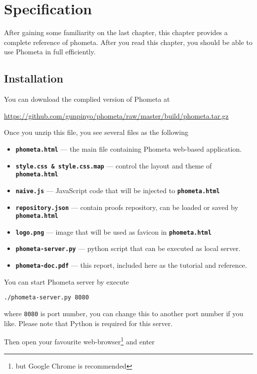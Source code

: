 \documentclass[master.tex]{subfiles}
\begin{document}
\chapter{Specification}
\label{chap:specification}

After gaining some familiarity on the last chapter, this chapter provides a
complete reference of phometa. After you read this chapter, you should be able
to use Phometa in full efficiently.

\section{Installation}

You can download the complied version of Phometa at

{\centering\url{https://github.com/gunpinyo/phometa/raw/master/build/phometa.tar.gz}}

Once you unzip this file, you see several files as the following

\begin{itemize}
\item \texttt{\textbf{phometa.html}} --- the main file containing Phometa
  web-based application.
\item \texttt{\textbf{style.css \& style.css.map}} --- control the layout and
  theme of \texttt{\textbf{phometa.html}}
\item \texttt{\textbf{naive.js}} --- JavaScript code that will be injected to
  \texttt{\textbf{phometa.html}}
\item \texttt{\textbf{repository.json}} --- contain proofs repository, can be
  loaded or saved by \texttt{\textbf{phometa.html}}
\item \texttt{\textbf{logo.png}} --- image that will be used as favicon in
  \texttt{\textbf{phometa.html}}
\item \texttt{\textbf{phometa-server.py}} --- python script that can be executed
  as local server.
\item \texttt{\textbf{phometa-doc.pdf}} --- this report, included here as the
  tutorial and reference.
\end{itemize}

You can start Phometa server by execute

\texttt{./phometa-server.py 8080}

where \texttt{8080} is port number, you can change this to another port number
if you like. Please note that Python is required for this server.

Then open your favourite web-browser\footnote{but Google Chrome is recommended}
and enter
\end{document}
